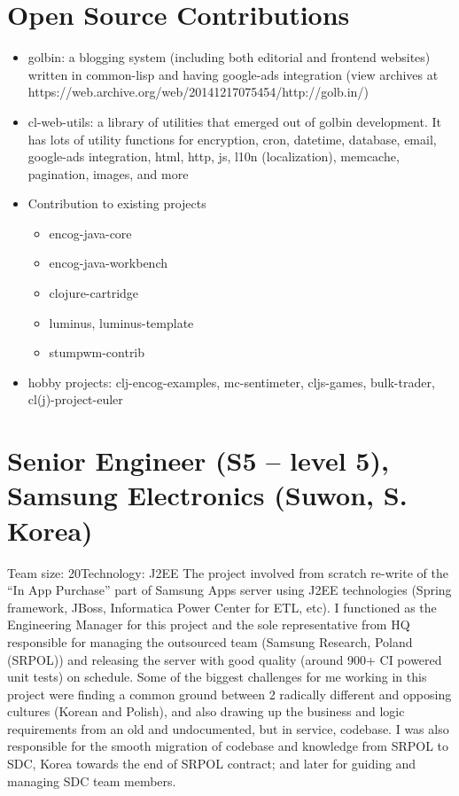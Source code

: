 \documentclass[11pt,a4paper,sans]{moderncv} %
\begin{document}
\section{Open Source Contributions}
         {\begin{itemize}
           \item golbin: a blogging system (including both editorial and frontend websites) written in common-lisp and having google-ads integration (view archives at https://web.archive.org/web/20141217075454/http://golb.in/)
           \item cl-web-utils: a library of utilities that emerged out of golbin development. It has lots of utility functions for encryption, cron, datetime, database, email, google-ads integration, html, http, js, l10n (localization), memcache, pagination, images, and more
           \item Contribution to existing projects
             \begin{itemize}
             \item encog-java-core
             \item encog-java-workbench
             \item clojure-cartridge
             \item luminus, luminus-template
             \item stumpwm-contrib
             \end{itemize}
           \item hobby projects: clj-encog-examples, mc-sentimeter, cljs-games, bulk-trader, cl(j)-project-euler
         \end{itemize}}

\newpage{}
\section{Senior Engineer (S5 -- level 5), Samsung Electronics (Suwon, S. Korea)}
         {Team size: 20}{Technology: J2EE}
         {The project involved from scratch re-write of the ``In App Purchase'' part of Samsung Apps server using J2EE technologies (Spring framework, JBoss, Informatica Power Center for ETL, etc). I functioned as the Engineering Manager for this project and the sole representative from HQ responsible for managing the outsourced team (Samsung Research, Poland (SRPOL)) and releasing the server with good quality (around 900+ CI powered unit tests) on schedule. Some of the biggest challenges for me working in this project were finding a common ground between 2 radically different and opposing cultures (Korean and Polish), and also drawing up the business and logic requirements from an old and undocumented, but in service, codebase. I was also responsible for the smooth migration of codebase and knowledge from SRPOL to SDC, Korea towards the end of SRPOL contract; and later for guiding and managing SDC team members.}
\end{document}
